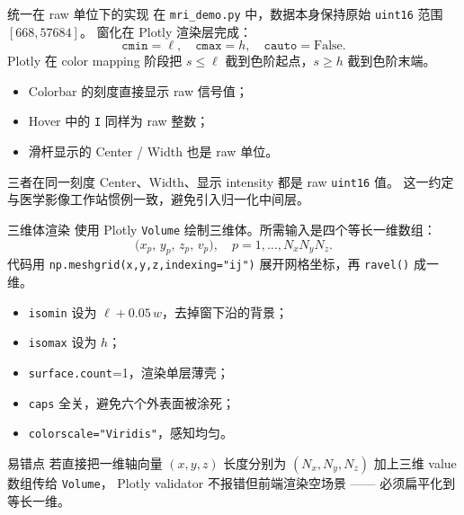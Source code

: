 \documentclass[aspectratio=169,11pt]{ctexbeamer}
\begin{document}
\begin{frame}{统一在 raw 单位下的实现}
  \small
  在 \texttt{mri\_demo.py} 中，数据本身保持原始 \texttt{uint16} 范围 $[668,57684]$。
  窗化在 Plotly 渲染层完成：
  \[
    \texttt{cmin}=\ell,\quad
    \texttt{cmax}=h,\quad
    \texttt{cauto}=\text{False}.
  \]
  Plotly 在 color mapping 阶段把 $s\le \ell$ 截到色阶起点，$s\ge h$ 截到色阶末端。

  \begin{itemize}
    \item Colorbar 的刻度直接显示 raw 信号值；
    \item Hover 中的 \texttt{I} 同样为 raw 整数；
    \item 滑杆显示的 Center / Width 也是 raw 单位。
  \end{itemize}

  \begin{block}{三者在同一刻度}
    Center、Width、显示 intensity 都是 raw \texttt{uint16} 值。
    这一约定与医学影像工作站惯例一致，避免引入归一化中间层。
  \end{block}
\end{frame}

\begin{frame}{三维体渲染}
  \small
  使用 Plotly \texttt{Volume} 绘制三维体。所需输入是四个等长一维数组：
  \[
    \bigl(x_p,\,y_p,\,z_p,\,v_p\bigr),\quad p=1,\dots,N_xN_yN_z .
  \]
  代码用 \texttt{np.meshgrid(x,y,z,indexing="ij")} 展开网格坐标，再
  \texttt{ravel()} 成一维。

  \begin{itemize}
    \item \texttt{isomin} 设为 $\ell+0.05\,w$，去掉窗下沿的背景；
    \item \texttt{isomax} 设为 $h$；
    \item \texttt{surface.count}=1，渲染单层薄壳；
    \item \texttt{caps} 全关，避免六个外表面被涂死；
    \item \texttt{colorscale="Viridis"}，感知均匀。
  \end{itemize}

  \begin{block}{易错点}
    若直接把一维轴向量 $(x,y,z)$ 长度分别为 $(N_x,N_y,N_z)$ 加上三维 value 数组传给 \texttt{Volume}，
    Plotly validator 不报错但前端渲染空场景 —— 必须扁平化到等长一维。
  \end{block}
\end{frame}
\end{document}
